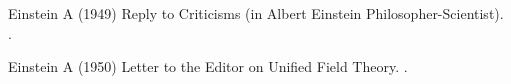 \item Einstein A (1949) Reply to Criticisms (in Albert Einstein Philosopher-Scientist). .

\item Einstein A (1950) Letter to the Editor on Unified Field Theory. .

